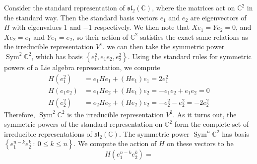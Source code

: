 \documentclass[psamsfonts]{amsart}
\theoremstyle{definition}
\theoremstyle{remark}
\renewcommand{\sl}{\mathfrak{sl}}
\newcommand{\C}{\mathbb{C}}
\newcommand{\set}[1]{\left\lbrace #1 \right\rbrace}
\DeclareMathOperator{\Sym}{Sym}
\begin{document}
Consider the standard representation of $\sl_2(\C)$, where the matrices
act on $\C^2$ in the standard way. Then the standard basis vectors $e_1$ and $e_2$
are eigenvectors of $H$ with eigenvalues $1$ and $-1$ respectively. We then note
that $Xe_1 = Ye_2 = 0$, and $Xe_2 = e_1$ and $Ye_1 = e_2$, so their action of
$\C^2$ satisfies the exact same relations as the irreducible representation $V^1$.
we can then take the symmetric power $\Sym^2\C^2$, which has basis
$\set{e_1^2, e_1e_2, e_2^2}$. Using the standard rules for symmetric powers
of a Lie algebra representation, we compute
\begin{align*}
H(e_1^2) &= e_1He_1 + (He_1) e_1 = 2e_1^2 \\
H(e_1e_2) &= e_1He_2 + (He_1) e_2 = -e_1e_2 + e_1e_2 = 0 \\
H(e_2^2) &= e_2He_2 + (He_2) e_2 = -e_2^2 - e_2^2 = -2e_2^2
\end{align*}
Therefore, $\Sym^2\C^2$ is the irreducible representation $V^2$. As it turns
out, the symmetric powers of the standard representation on $\C^2$ form the
complete set of irreducible representations of $\sl_2(\C)$. The symmetric power
$\Sym^n\C^2$ has basis $\set{e_1^{n-k}e_2^k ~:~ 0 \leq k \leq n}$. We compute
the action of $H$ on these vectors to be
\[
H(e_1^{n-k}e_2^k) =
\]
%
\end{document}
